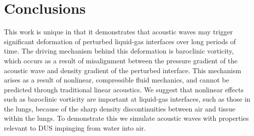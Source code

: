 \section{Conclusions}
\label{sec:usbe_lung_conclusions}
This work is unique in that it demonstrates that acoustic waves may
trigger significant deformation of perturbed liquid-gas interfaces
over long periods of time. The driving mechanism behind this
deformation is baroclinic vorticity, which occurs as a result of
misalignment between the pressure gradient of the acoustic wave and
density gradient of the perturbed interface. This mechanism arises as
a result of nonlinear, compressible fluid mechanics, and cannot be
predicted through traditional linear acoustics. We suggest that
nonlinear effects such as baroclinic vorticity are important at
liquid-gas interfaces, such as those in the lungs, because of the
sharp density discontinuities between air and tissue within the
lungs. To demonstrate this we simulate acoustic waves with properties
relevant to \ac{DUS} impinging from water into air.

